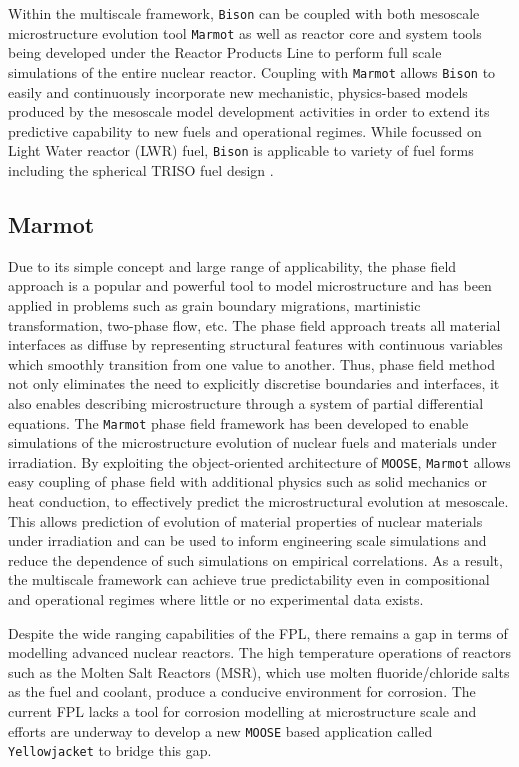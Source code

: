 	Within the multiscale framework, \texttt{Bison} can be coupled with both mesoscale microstructure evolution tool \texttt{Marmot} as well as reactor core and system tools being developed under the Reactor Products Line to perform full scale simulations of the entire nuclear reactor. Coupling with \texttt{Marmot} allows \texttt{Bison} to easily and continuously incorporate new mechanistic, physics-based models produced by the mesoscale model development activities in order to extend its predictive capability to new fuels and operational regimes. While focussed on Light Water reactor (LWR) fuel, \texttt{Bison} is applicable to variety of fuel forms including the spherical TRISO fuel design \cite{NEAMS}.

	\subsection{Marmot}
	Due to its simple concept and large range of applicability, the phase field approach is a popular and powerful tool to model microstructure and has been applied in problems such as grain boundary migrations, martinistic transformation, two-phase flow, etc. The phase field approach treats all material interfaces as diffuse by representing structural features with continuous variables which smoothly transition from one value to another. Thus, phase field method not only eliminates the need to explicitly discretise boundaries and interfaces, it also enables describing microstructure through a system of partial differential equations.  The \texttt{Marmot} phase field framework has been developed to enable simulations of the microstructure evolution of nuclear fuels and materials under irradiation. By exploiting the object-oriented architecture of \texttt{MOOSE}, \texttt{Marmot} allows easy coupling of phase field with additional physics such as solid mechanics or heat conduction, to effectively predict the microstructural evolution at mesoscale. This allows prediction of evolution of material properties of nuclear materials under irradiation and can be used to inform engineering scale simulations and reduce the dependence of such simulations on empirical correlations. As a result, the multiscale framework can achieve true predictability even in compositional and operational regimes where little or no experimental data exists.

	Despite the wide ranging capabilities of the FPL, there remains a gap in terms of modelling advanced nuclear reactors. The high temperature operations of reactors such as the Molten Salt Reactors (MSR), which use molten fluoride/chloride salts as the fuel and coolant, produce a conducive environment for corrosion. The current FPL lacks a tool for corrosion modelling at microstructure scale and efforts are underway to develop a new \texttt{MOOSE} based application called \texttt{Yellowjacket} to bridge this gap.

